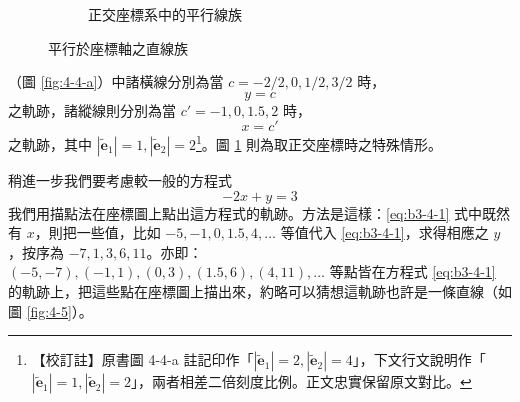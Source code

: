 \begin{figure}[H]
\begin{subfigure}[b]{0.48\textwidth}
\caption{正交座標系中的平行線族}
\label{fig:4-4-b}
\end{subfigure}
\caption{平行於座標軸之直線族}
\label{fig:4-4}
\end{figure}

（圖 \ref{fig:4-4-a}）中諸橫線分別為當 $c = -2/2, 0, 1/2, 3/2$ 時，
\[ y = c \]
之軌跡，諸縱線則分別為當 $c' = -1, 0, 1.5, 2$ 時，
\[ x = c' \]
之軌跡，其中 $|\tilde{\mathbf{e}}_1| = 1, |\tilde{\mathbf{e}}_2| = 2$\footnote{\label{note:b3-ch4-p136-fig4-4-a-scale}【校訂註】原書圖 4-4-a 註記印作「$|\tilde{\mathbf{e}}_1| = 2, |\tilde{\mathbf{e}}_2| = 4$」，下文行文說明作「$|\tilde{\mathbf{e}}_1| = 1, |\tilde{\mathbf{e}}_2| = 2$」，兩者相差二倍刻度比例。正文忠實保留原文對比。}。圖 \ref{fig:4-4-b} 則為取正交座標時之特殊情形。

稍進一步我們要考慮較一般的方程式
\begin{equation}
-2x + y = 3
\label{eq:b3-4-1}
\end{equation}
我們用描點法在座標圖上點出這方程式的軌跡。方法是這樣：\eqref{eq:b3-4-1} 式中既然有 $x$，則把一些值，比如 $-5, -1, 0, 1.5, 4, \dots$ 等值代入 \eqref{eq:b3-4-1}，求得相應之 $y$，按序為 $-7, 1, 3, 6, 11$。亦即：$(-5, -7), (-1, 1), (0, 3), (1.5, 6), (4, 11), \dots$ 等點皆在方程式 \eqref{eq:b3-4-1} 的軌跡上，把這些點在座標圖上描出來，約略可以猜想這軌跡也許是一條直線（如圖 \ref{fig:4-5}）。

